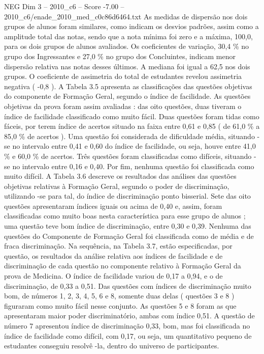 \begin{textsample}{NEG Dim 3 – 2010\_c6 – Score -7.00 – 2010\_c6/enade\_2010\_med\_c0c86d6464.txt}
As medidas de dispersão nos dois grupos de alunos foram similares, como indicam os desvios padrões, assim como a amplitude total das notas, sendo que a nota mínima foi zero e a máxima, 100,0, para os dois grupos de alunos avaliados.
Os coeficientes de variação, 30,4 \% no grupo dos Ingressantes e 27,0 \% no grupo dos Concluintes, indicam menor dispersão relativa nas notas desses últimos.
A mediana foi igual a 62,5 nos dois grupos.
O coeficiente de assimetria do total de estudantes revelou assimetria negativa ( -0,8 ).
A Tabela 3.5 apresenta as classificações das questões objetivas do componente de Formação Geral, segundo o índice de facilidade.
As questões objetivas da prova foram assim avaliadas : das oito questões, duas tiveram o índice de facilidade classificado como muito fácil.
Duas questões foram tidas como fáceis, por terem índice de acertos situado na faixa entre 0,61 e 0,85 ( de 61,0 \% a 85,0 \% de acertos ).
Uma questão foi considerada de dificuldade média, situando -se no intervalo entre 0,41 e 0,60 do índice de facilidade, ou seja, houve entre 41,0 \% e 60,0 \% de acertos.
Três questões foram classificadas como difíceis, situando -se no intervalo entre 0,16 e 0,40.
Por fim, nenhuma questão foi classificada como muito difícil.
A Tabela 3.6 descreve os resultados das análises das questões objetivas relativas à Formação Geral, segundo o poder de discriminação, utilizando -se para tal, do índice de discriminação ponto bisserial.
Sete das oito questões apresentaram índices iguais ou acima de 0,40 e, assim, foram classificadas como muito boas nesta característica para esse grupo de alunos ; uma questão teve bom índice de discriminação, entre 0,30 e 0,39.
Nenhuma das questões do Componente de Formação Geral foi classificada como de média e de fraca discriminação.
Na sequência, na Tabela 3.7, estão especificadas, por questão, os resultados da análise relativa aos índices de facilidade e de discriminação de cada questão no componente relativo à Formação Geral da prova de Medicina.
O índice de facilidade variou de 0,17 a 0,94, e o de discriminação, de 0,33 a 0,51.
Das questões com índices de discriminação muito bom, de números 1, 2, 3, 4, 5, 6 e 8, somente duas delas ( questões 3 e 8 ) figuraram como muito fácil nesse conjunto.
As questões 5 e 8 foram as que apresentaram maior poder discriminatório, ambas com índice 0,51.
A questão de número 7 apresentou índice de discriminação 0,33, bom, mas foi classificada no índice de facilidade como difícil, com 0,17, ou seja, um quantitativo pequeno de estudantes conseguiu resolvê -la, dentro do universo de participantes.

\end{textsample}
